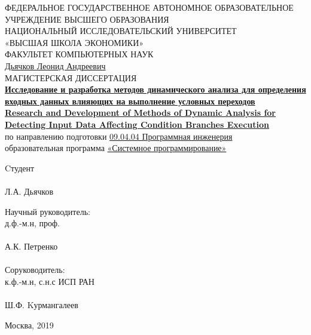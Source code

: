 \begin{titlepage}
	\begin{center}
	\textsc{\normalsize{ФЕДЕРАЛЬНОЕ ГОСУДАРСТВЕННОЕ АВТОНОМНОЕ ОБРАЗОВАТЕЛЬНОЕ}}\\
\textsc{\normalsize{УЧРЕЖДЕНИЕ ВЫСШЕГО ОБРАЗОВАНИЯ}}\\
\textsc{\normalsize{НАЦИОНАЛЬНЫЙ ИССЛЕДОВАТЕЛЬСКИЙ УНИВЕРСИТЕТ}}\\
\textsc{\normalsize{{«ВЫСШАЯ ШКОЛА ЭКОНОМИКИ»}}\\
	\normalsize{ФАКУЛЬТЕТ КОМПЬЮТЕРНЫХ НАУК}}
	\\[.5cm]
	\normalsize{\underline{Дьячков Леонид Андреевич}}\\[.5cm]

	\normalsize{МАГИСТЕРСКАЯ ДИССЕРТАЦИЯ}\\[.8cm]

	{\normalsize {\ul{\textbf{Исследование и разработка методов динамического анализа для определения входных данных влияющих на выполнение условных переходов}}}} \\[.3cm]
	{\normalsize {\ul{\textbf{Research and Development of Methods of Dynamic Analysis for Detecting Input Data Affecting Condition Branches Execution}}}}\\[.5cm]

	по направлению подготовки \underline{09.04.04 Программная инженерия}\\
	образовательная программа \underline{«Системное программирование»}

	\begin{flushleft}
	Cтудент\\
	\underline{\hspace{3cm}}\\
	Л.А. Дьячков\\
	\end{flushleft}
	\begin{flushright}
		
		Научный руководитель: \\ 
		д.ф.-м.н, проф. \\
		\underline{\hspace{3cm}}\\
		А.К. Петренко \\
		\\
		Соруководитель: \\ 
		к.ф.-м.н, с.н.с ИСП РАН \\
		\underline{\hspace{3cm}}\\
		Ш.Ф. Kурмангалеев \\
	\end{flushright}
	\vfill
	
	Москва, 2019
	\end{center}

\end{titlepage}
